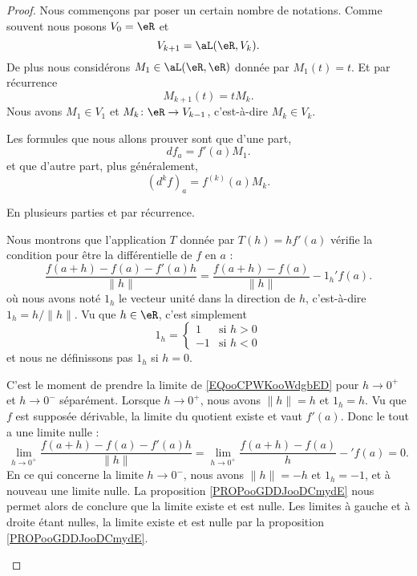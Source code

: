 \begin{proof}
	Nous commençons par poser un certain nombre de notations. Comme souvent nous posons \( V_0=\eR\) et
	\begin{equation}
		V_{k+1}=\aL(\eR,V_k).
	\end{equation}
	De plus nous considérons \( M_1\in \aL(\eR,\eR)\) donnée par \( M_1(t)=t\). Et par récurrence
	\begin{equation}
		M_{k+1}(t)=tM_{k}.
	\end{equation}
	Nous avons \( M_1\in V_1\) et \( M_k\colon \eR\to V_{k-1}\), c'est-à-dire \( M_k\in V_k\).

	Les formules que nous allons prouver sont que d'une part,
	\begin{equation}
		df_a=f'(a)M_1.
	\end{equation}
	et que d'autre part, plus généralement,
	\begin{equation}
		(d^kf)_a=f^{(k)}(a)M_k.
	\end{equation}

	En plusieurs parties et par récurrence.
	\begin{subproof}
		Nous montrons que l'application \( T\) donnée par \( T(h)=hf'(a)\) vérifie la condition pour être la différentielle de \( f\) en \( a\) :
		\begin{equation}        \label{EQooCPWKooWdgbED}
			\frac{ f(a+h)-f(a)-f'(a)h }{ \| h \| }=\frac{ f(a+h)-f(a) }{ \| h \| }-1_h'f(a).
		\end{equation}
		où nous avons noté \( 1_h\) le vecteur unité dans la direction de \( h\), c'est-à-dire \( 1_h=h/\| h \|\). Vu que \( h\in \eR\), c'est simplement
		\begin{equation}
			1_h=\begin{cases}
				1  & \text{si } h>0 \\
				-1 & \text{si }h<0
			\end{cases}
		\end{equation}
		et nous ne définissons pas \( 1_h\) si \( h=0\).

		C'est le moment de prendre la limite de \eqref{EQooCPWKooWdgbED} pour \( h\to 0^+\) et \( h\to 0^-\) séparément. Lorsque \( h\to 0^+\), nous avons \( \| h \|=h\) et \( 1_h=h\). Vu que \( f\) est supposée dérivable, la limite du quotient existe et vaut \( f'(a)\). Donc le tout a une limite nulle :
		\begin{equation}
			\lim_{h\to 0^+} \frac{ f(a+h)-f(a)-f'(a)h }{ \| h \| }=\lim_{h\to 0^+}\frac{ f(a+h)-f(a) }{  h  }-'f(a)=0.
		\end{equation}
		En ce qui concerne la limite \( h\to 0^-\), nous avons \( \| h \|=-h\) et \( 1_h=-1\), et à nouveau une limite nulle. La proposition \ref{PROPooGDDJooDCmydE} nous permet alors de conclure que la limite existe et est nulle. Les limites à gauche et à droite étant nulles, la limite existe et est nulle par la proposition \ref{PROPooGDDJooDCmydE}.


\end{subproof}
\end{proof}
